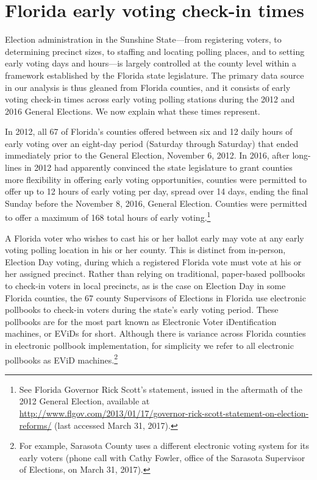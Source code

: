 \documentclass[12pt,titlepage]{article}
\begin{document}
\section*{Florida early voting check-in times}

Election administration in the Sunshine State---from registering
voters, to determining precinct sizes, to staffing and locating
polling places, and to setting early voting days and hours---is
largely controlled at the county level within a framework established
by the Florida state legislature. The primary data source in our
analysis is thus gleaned from Florida counties, and it consists of
early voting check-in times across early voting polling stations
during the 2012 and 2016 General Elections.  We now explain what these
times represent.

In 2012, all 67 of Florida's counties offered between six and 12 daily
hours of early voting over an eight-day period (Saturday through
Saturday) that ended immediately prior to the General Election,
November 6, 2012.  In 2016, after long-lines in 2012 had apparently
convinced the state legislature to grant counties more flexibility in
offering early voting opportunities, counties were permitted to offer
up to 12 hours of early voting per day, spread over 14 days, ending
the final Sunday before the November 8, 2016, General Election.
Counties were permitted to offer a maximum of 168 total hours of early
voting.\footnote{See Florida Governor Rick Scott's statement, issued
  in the aftermath of the 2012 General Election, available at
  \url{http://www.flgov.com/2013/01/17/governor-rick-scott-statement-on-election-reforms/}
  (last accessed March 31, 2017).}

A Florida voter who wishes to cast his or her ballot early may vote at
any early voting polling location in his or her county.  This is
distinct from in-person, Election Day voting, during which a
registered Florida vote must vote at his or her assigned precinct.
Rather than relying on traditional, paper-based pollbooks to check-in
voters in local precincts, as is the case on Election Day in some
Florida counties, the 67 county Supervisors of Elections in Florida
use electronic pollbooks to check-in voters during the state's early
voting period.  These pollbooks are for the most part known as
Electronic Voter iDentification machines, or EViDs for short.
Although there is variance across Florida counties in electronic
pollbook implementation, for simplicity we refer to all electronic
pollbooks as EViD machines.\footnote{For example, Sarasota County uses
  a different electronic voting system for its early voters (phone
  call with Cathy Fowler, office of the Sarasota Supervisor of
  Elections, on March 31, 2017).}
\end{document}
